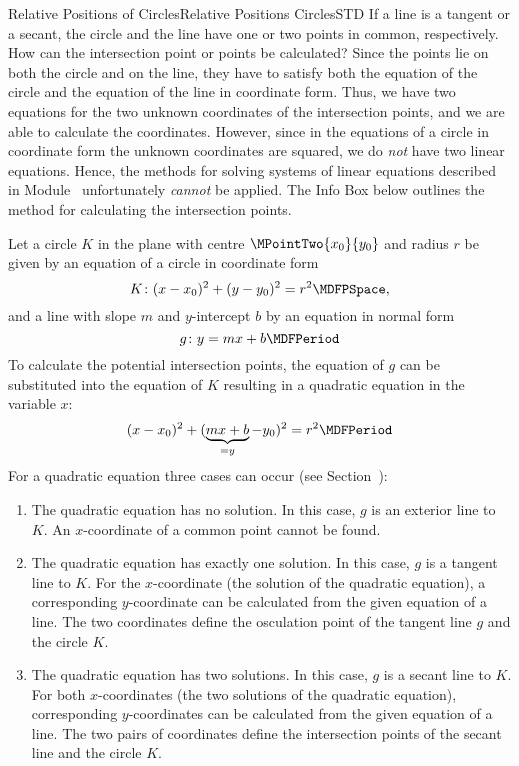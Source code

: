 \begin{MXContent}{Relative Positions of Circles}{Relative Positions Circles}{STD}
If a line is a tangent or a secant, the circle and the line have one or two points in common, respectively.
How can the intersection point or points be calculated? Since the points lie on both the circle and on the line, 
they have to satisfy both the equation of the circle and the equation of the line in coordinate form.  
Thus, we have two equations for the two unknown coordinates of the intersection points, and we are 
able to calculate the coordinates. However, since in the equations of a 
circle in coordinate form the unknown coordinates are squared, we do \textit{not} have two linear equations.
Hence, the methods for solving systems of linear equations described in Module~ unfortunately \textit{cannot} be applied. 
The Info Box below outlines the method for calculating the intersection points.

\begin{MInfo}
 Let a circle $K$ in the plane with centre $\MPointTwo{x_0}{y_0}$ and radius $r$ be given 
  by an equation of a circle in coordinate form
\[
 K\colon (x-x_0)^2+(y-y_0)^2=r^2 \MDFPSpace ,
\]
  and a line with slope $m$ and $y$-intercept $b$ by an equation in normal form
\[
 g\colon y=m x+b\MDFPeriod
\]
To calculate the potential intersection points, the equation of $g$ can be substituted into the 
equation of $K$ resulting in a quadratic equation in the variable $x$:
\[
 (x-x_0)^2+(\underbrace{m x+b}_{=y}-y_0)^2=r^2\MDFPeriod
\]
For a quadratic equation three cases can occur (see Section~):
\begin{enumerate}
 \item The quadratic equation has no solution. In this case, $g$ is an exterior line to $K$. An $x$-coordinate
  of a common point cannot be found.
 \item The quadratic equation has exactly one solution. In this case, $g$ is a tangent line to $K$. For the
  $x$-coordinate (the solution of the quadratic equation), a corresponding $y$-coordinate can be calculated 
  from the given equation of a line. The two coordinates define the osculation point of the tangent line $g$ 
  and the circle $K$. 
 \item The quadratic equation has two solutions. In this case, $g$ is a secant line to $K$. For both
  $x$-coordinates (the two solutions of the quadratic equation), corresponding $y$-coordinates can be calculated 
  from the given equation of a line. The two pairs of coordinates define the intersection points of the secant line 
  and the circle $K$.
\end{enumerate}


\end{MInfo}
\end{MXContent}
